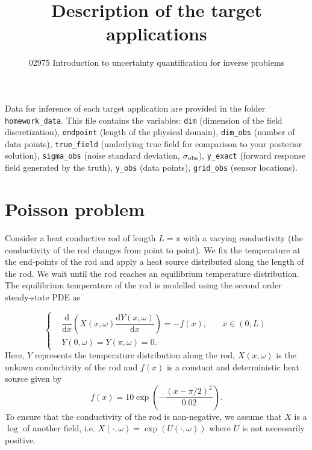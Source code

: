 \documentclass[11pt,a4paper]{article}
\newcommand{\dd}{\mathrm{d}}
\begin{document}
\title{Description of the target applications}
\author{02975 Introduction to uncertainty quantification for inverse problems}
\date{}
\maketitle


Data for inference of each target application are provided in the folder \texttt{homework\_data}. This file contains the variables: \texttt{dim} (dimension of the field discretization), \texttt{endpoint} (length of the physical domain), \texttt{dim\_obs} (number of data points), \texttt{true\_field} (underlying true field for comparison to your posterior solution), \texttt{sigma\_obs} (noise standard deviation, $\sigma_{\rm obs}$), \texttt{y\_exact} (forward response field generated by the truth), \texttt{y\_obs} (data points), \texttt{grid\_obs} (sensor locations).


\section{Poisson problem}
Consider a heat conductive rod of length $L = \pi$ with a varying conductivity (the conductivity of the rod changes from point to point). We fix the temperature at the end-points of the rod and apply a heat source distributed along the length of the rod. We wait until the rod reaches an equilibrium temperature distribution. The equilibrium temperature of the rod is modelled using the second order steady-state PDE as

\begin{equation}\label{eq:diff_eq_1D}
\left\{
\begin{aligned}
& \dfrac{\dd}{\dd x}\left(X(x,\omega) \dfrac{\dd Y(x,\omega)}{\dd x}\right) = -f(x), \quad & x\in (0,L) \\
& Y(0,\omega) = Y(\pi,\omega) = 0.
\end{aligned}
\right.
\end{equation}
Here, $Y$ represents the temperature distribution along the rod, $X(x, \omega) $ is the unkown conductivity of the rod and $f(x)$ is a constant and deterministic heat source given by
\begin{equation*}
	f(x) = 10\exp( -\frac{ (x - \pi/2)^2} {0.02} ).
\end{equation*}
To ensure that the conductivity of the rod is non-negative, we assume that $X$ is a $\log$ of another field, i.e. $X( \cdot , \omega ) = \exp( U( \cdot , \omega ) )$ where $U$ is not necessarily positive.
\end{document}

